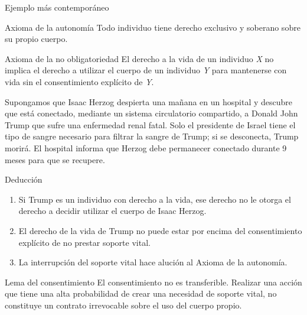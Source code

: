 \documentclass{beamer}
\begin{document}
\begin{frame}{Ejemplo más contemporáneo}
     \begin{block}{Axioma de la autonomía}
        Todo individuo tiene derecho exclusivo y soberano sobre su propio cuerpo.
     \end{block}
     \pause
         \begin{block}{Axioma de la no obligatoriedad}
        El derecho a la vida de un individuo \textit{X} no implica el derecho a utilizar el cuerpo de un
        individuo \textit{Y} para mantenerse con vida sin el consentimiento explícito de \textit{Y}.
     \end{block}
     \pause
     Supongamos que Isaac Herzog despierta una mañana en un hospital y descubre que está conectado, 
     mediante un sistema circulatorio compartido, a Donald John Trump que sufre una enfermedad renal 
     fatal. Solo el presidente de Israel tiene el tipo de sangre necesario para filtrar la sangre de Trump;
    si se desconecta, Trump morirá. El hospital informa que Herzog debe permanecer conectado durante 9 meses
     para que se recupere.       
\end{frame}

\begin{frame}
    \begin{block}{Deducción}
        \begin{enumerate}
            \item Si Trump es un individuo con derecho a la vida, ese derecho no le otorga el derecho
            a decidir utilizar el cuerpo de Isaac Herzog.
            \pause
            \item El derecho de la vida de Trump no puede estar por encima del consentimiento explícito
            de no prestar soporte vital.
            \pause
            \item La interrupción del soporte vital hace alución al Axioma de la autonomía.
        \end{enumerate}
    \end{block}

    \begin{block}{Lema del consentimiento}
        El consentimiento no es transferible. Realizar una acción que tiene una alta probabilidad
        de crear una necesidad de soporte vital, no constituye un contrato irrevocable sobre el uso
        del cuerpo propio.
    \end{block}
\end{frame}
\end{document}
